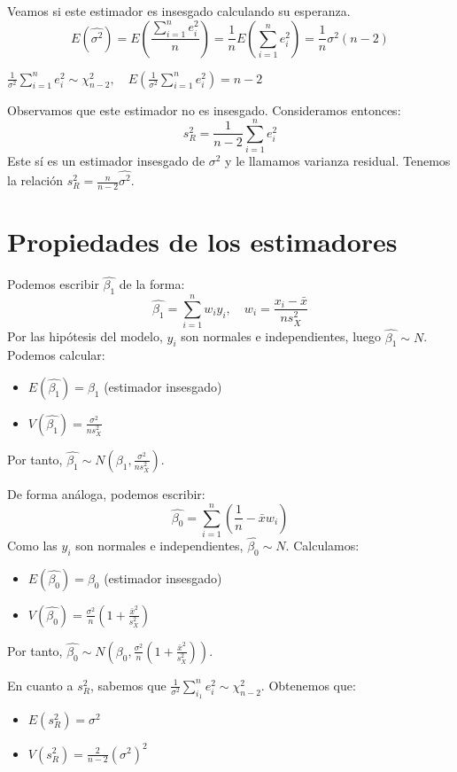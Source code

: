 Veamos si este estimador es insesgado calculando su esperanza.
$$E(\hat{\sigma^2}) = E(\frac{\sum_{i=1}^n e_i^2}{n}) = \frac{1}{n}E(\sum_{i=1}^n e_i^2) = \frac{1}{n}\sigma^2(n-2)$$

\begin{note}
    $\frac{1}{\sigma^2} \sum_{i=1}^n e_i^2 \sim \chi^2_{n-2}, \quad E(\frac{1}{\sigma^2} \sum_{i=1}^n e_i^2) = n-2$
\end{note}

Observamos que este estimador no es insesgado. Consideramos entonces:
$$s_R^2 = \frac{1}{n-2}\sum_{i=1}^n e_i^2$$
Este sí es un estimador insesgado de $\sigma^2$ y le llamamos varianza residual.
Tenemos la relación $s_R^2 = \frac{n}{n-2} \hat{\sigma^2}$.

\section{Propiedades de los estimadores}
Podemos escribir $\hat{\beta_1}$ de la forma:
$$\hat{\beta_1} = \sum_{i=1}^n w_iy_i, \quad w_i = \frac{x_i - \bar{x}}{ns_X^2}$$
Por las hipótesis del modelo, $y_i$ son normales e independientes, luego $\hat{\beta_1} \sim N$.
Podemos calcular:

\begin{itemize}
    \item $E(\hat{\beta_1}) = \beta_1$ (estimador insesgado)
    \item $V(\hat{\beta_1}) = \frac{\sigma^2}{ns_X^2}$
\end{itemize}
Por tanto, $\hat{\beta_1} \sim N(\beta_1, \frac{\sigma^2}{ns_X^2})$.

De forma análoga, podemos escribir:
$$\hat{\beta_0} = \sum_{i=1}^n (\frac{1}{n} - \bar{x}w_i)$$
Como las $y_i$ son normales e independientes, $\hat{\beta_0} \sim N$.
Calculamos:

\begin{itemize}
    \item $E(\hat{\beta_0}) = \beta_0$ (estimador insesgado)
    \item $V(\hat{\beta_0}) = \frac{\sigma^2}{n} (1 + \frac{\bar{x}^2}{s_X^2})$
\end{itemize}
Por tanto, $\hat{\beta_0} \sim N(\beta_0, \frac{\sigma^2}{n} (1 + \frac{\bar{x}^2}{s_X^2}))$.

En cuanto a $s_R^2$, sabemos que $\frac{1}{\sigma^2} \sum_{i_1}^n e_i^2 \sim \chi^2_{n-2}$.
Obtenemos que:
\begin{itemize}
    \item $E(s_R^2) = \sigma^2$
    \item $V(s_R^2) = \frac{2}{n-2} (\sigma^2)^2$
\end{itemize}

